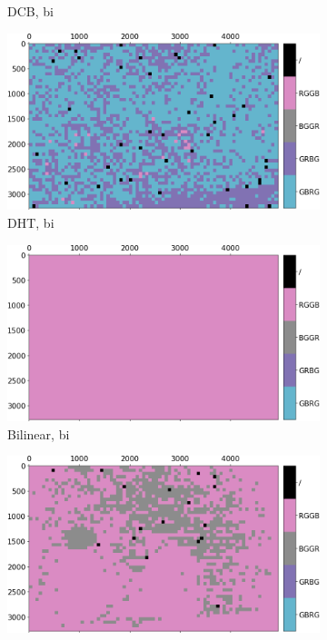 \documentclass{ipol}
\begin{document}
\begin{figure}[ht]
\begin{subfigure}[c]{.14\linewidth}
\caption{DCB, bi}
\end{subfigure}%
\begin{subfigure}[c]{.14\linewidth}
\includegraphics[width=\linewidth]{images/bike/DHT/bid_64_grids.png}
\caption{DHT, bi}
\end{subfigure}%
\begin{subfigure}[c]{.14\linewidth}
\includegraphics[width=\linewidth]{images/bike/LINEAR/bid_64_grids.png}
\caption{Bilinear, bi}
\end{subfigure}%
\begin{subfigure}[c]{.14\linewidth}
\includegraphics[width=\linewidth]{images/bike/PPG/bid_64_grids.png}

\end{subfigure}
\end{figure}
\end{document}
